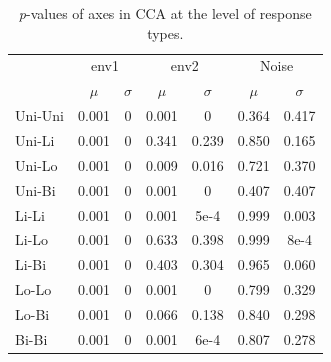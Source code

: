 		\begin{table}[h!]
				
				\small
				\caption{\textit{p}-values of axes in CCA at the level of response types.}
				\centering
				
				\begin{tabular}{@{}lcccccc@{}}
					
					\toprule
					& \multicolumn{2}{c}{env1} & \multicolumn{2}{c}{env2} & \multicolumn{2}{c}{Noise}\\\cmidrule(l){2-3} \cmidrule(l){4-5} \cmidrule(l){6-7}
					& $\mu$ & $\sigma$ & $\mu$ & $\sigma$ & $\mu$ & $\sigma$\\
					\hline
					Uni-Uni& 0.001 & 0 & 0.001 & 0     & 0.364 & 0.417 \\		
					Uni-Li & 0.001 & 0 & 0.341 & 0.239 & 0.850 & 0.165 \\ 		
					Uni-Lo & 0.001 & 0 & 0.009 & 0.016 & 0.721 & 0.370 \\       
					Uni-Bi & 0.001 & 0 & 0.001 & 0     & 0.407 & 0.407 \\ 		
					Li-Li  & 0.001 & 0 & 0.001 & 5e-4  & 0.999 & 0.003 \\ 		
					Li-Lo  & 0.001 & 0 & 0.633 & 0.398 & 0.999 & 8e-4  \\		
					Li-Bi  & 0.001 & 0 & 0.403 & 0.304 & 0.965 & 0.060 \\ 		
					Lo-Lo  & 0.001 & 0 & 0.001 & 0     & 0.799 & 0.329 \\ 		
					Lo-Bi  & 0.001 & 0 & 0.066 & 0.138 & 0.840 & 0.298 \\ 		
					Bi-Bi  & 0.001 & 0 & 0.001 & 6e-4  & 0.807 & 0.278 \\		
					\toprule
					
				\end{tabular}
			
				\label{tab:ccasm4}
			
			\end{table}
		
		\vspace{10em}
		
